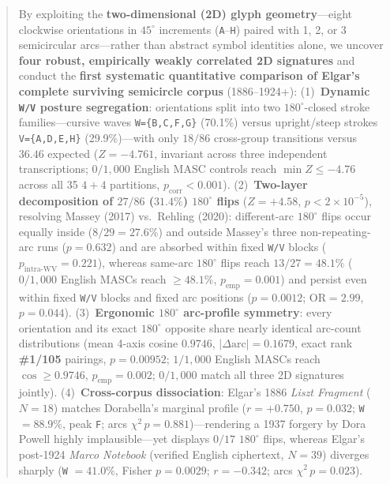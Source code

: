 \documentclass[10pt,a4paper,twocolumn]{article}
\newcommand{\code}[1]{\texttt{\small #1}}
\begin{document}
\begin{@twocolumnfalse}
\begin{abstract}
By exploiting the \textbf{two-dimensional (2D) glyph geometry}---eight clockwise orientations in $45^\circ$ increments (\code{A}--\code{H}) paired with 1, 2, or 3 semicircular arcs---rather than abstract symbol identities alone, we uncover \textbf{four robust, empirically weakly correlated 2D signatures} and conduct the \textbf{first systematic quantitative comparison of Elgar's complete surviving semicircle corpus} (1886--1924+):
(1)~\textbf{Dynamic \code{W/V} posture segregation}: orientations split into two $180^\circ$-closed stroke families---cursive waves \code{W=\{B,C,F,G\}} (70.1\%) versus upright/steep strokes \code{V=\{A,D,E,H\}} (29.9\%)---with only $18/86$ cross-group transitions versus $36.46$ expected ($Z = -4.761$, invariant across three independent transcriptions; $0/1{,}000$ English MASC controls reach $\min Z \le -4.76$ across all 35 $4{+}4$ partitions, $p_{\mathrm{corr}} < 0.001$).
(2)~\textbf{Two-layer decomposition of $27/86$ ($31.4\%$) $180^\circ$ flips} ($Z = +4.58$, $p < 2\times 10^{-5}$), resolving Massey (2017) vs.\ Rehling (2020): different-arc $180^\circ$ flips occur equally inside ($8/29 = 27.6\%$) and outside Massey's three non-repeating-arc runs ($p = 0.632$) and are absorbed within fixed \code{W/V} blocks ($p_{\mathrm{intra\text{-}WV}} = 0.221$), whereas same-arc $180^\circ$ flips reach $13/27 = 48.1\%$ ($0/1{,}000$ English MASCs reach $\ge 48.1\%$, $p_{\mathrm{emp}} = 0.001$) and persist even within fixed \code{W/V} blocks and fixed arc positions ($p = 0.0012$; $\mathrm{OR} = 2.99$, $p = 0.044$).
(3)~\textbf{Ergonomic $180^\circ$ arc-profile symmetry}: every orientation and its exact $180^\circ$ opposite share nearly identical arc-count distributions (mean 4-axis cosine $0.9746$, $|\Delta\mathrm{arc}| = 0.1679$, exact rank \textbf{\#1/105} pairings, $p = 0.00952$; $1/1{,}000$ English MASCs reach $\cos \ge 0.9746$, $p_{\mathrm{emp}} = 0.002$; $0/1{,}000$ match all three 2D signatures jointly).
(4)~\textbf{Cross-corpus dissociation}: Elgar's 1886 \emph{Liszt Fragment} ($N=18$) matches Dorabella's marginal profile ($r = +0.750$, $p = 0.032$; \code{W} $= 88.9\%$, peak \code{F}; arcs $\chi^2\,p = 0.881$)---rendering a 1937 forgery by Dora Powell highly implausible---yet displays $0/17$ $180^\circ$ flips, whereas Elgar's post-1924 \emph{Marco Notebook} (verified English ciphertext, $N=39$) diverges sharply (\code{W} $= 41.0\%$, Fisher $p = 0.0029$; $r = -0.342$; arcs $\chi^2\,p = 0.023$).


\end{abstract}
\end{@twocolumnfalse}
\end{document}
